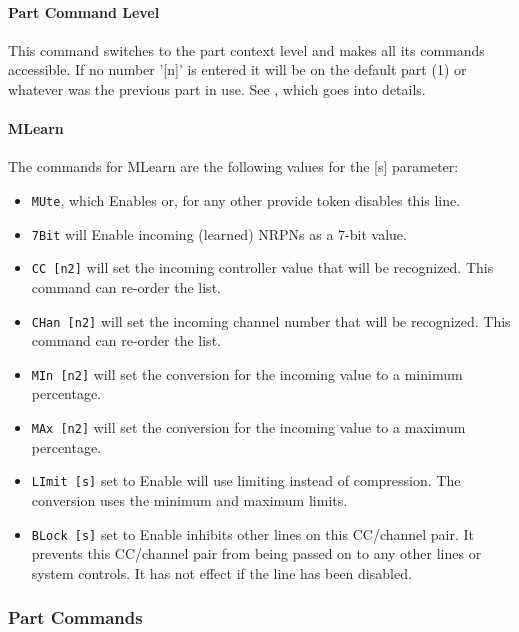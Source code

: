 \paragraph{Part Command Level}
\label{paragraph:command_line_context_level_part}

   This command switches to the part context level and makes all its commands
   accessible.  If no number '[n]' is entered it will be on the default part
   (1) or whatever was the previous part in use.
   See , which goes into
   details.

\paragraph{MLearn}
\label{paragraph:command_line_mlearn}

   The commands for MLearn are the following values for the [s] parameter:

   \begin{itemize}
      \item \texttt{MUte}, which Enables or, for any other provide token
         disables this line.
      \item \texttt{7Bit} will Enable incoming (learned) NRPNs as a 7-bit value.
      \item \texttt{CC [n2]} will set the incoming controller value that will
         be recognized.  This command can re-order the list.
      \item \texttt{CHan [n2]} will set the incoming channel number that will
         be recognized.  This command can re-order the list.
      \item \texttt{MIn [n2]} will set the conversion for the incoming
         value to a minimum percentage.
      \item \texttt{MAx [n2]} will set the conversion for the incoming
         value to a maximum percentage.
      \item \texttt{LImit [s]} set to Enable will use limiting instead of
         compression.  The conversion uses the minimum and maximum limits.
      \item \texttt{BLock [s]} set to Enable inhibits other lines on this
         CC/channel pair.  It prevents this CC/channel pair from being passed
         on to any other lines or system controls.  It has not effect if the
         line has been disabled.
   \end{itemize}

\subsubsection{Part Commands}
\label{subsec:command_line_part_command_list}

